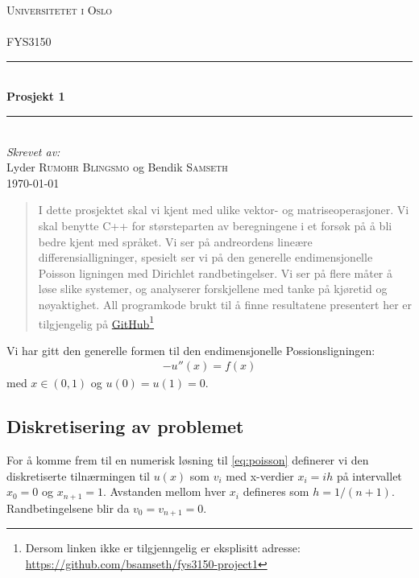 \documentclass[11pt]{article}
\begin{document}
\begin{titlepage}
\newcommand{\HRule}{\rule{\linewidth}{0.5mm}}
\center
\textsc{\LARGE Universitetet i Oslo}\\[1.5cm] %
\textsc{\Large }\\[0.5cm] %
\textsc{\large FYS3150}\\[0.5cm] %
\HRule \\[0.4cm]
{ \huge \bfseries Prosjekt 1 }\\[0.4cm] %
\HRule \\[1.5cm]
\Large \emph{Skrevet av:}\\
Lyder \textsc{Rumohr Blingsmo} og Bendik \textsc{Samseth}\\[3cm]
{\large \today}\\[3cm]
\vfill
\end{titlepage}


\begin{abstract}
I dette prosjektet skal vi kjent med ulike vektor- og
matriseoperasjoner. Vi skal benytte C++ for størsteparten av
beregningene i et forsøk på å bli bedre kjent med språket. Vi ser på
andreordens lineære differensialligninger, spesielt ser vi på den
generelle endimensjonelle Poisson ligningen med Dirichlet
randbetingelser. Vi ser på flere måter å løse slike systemer, og
analyserer forskjellene med tanke på kjøretid og nøyaktighet. All
programkode brukt til å finne resultatene presentert her er
tilgjengelig på
\href{https://github.com/bsamseth/fys3150-project1}{GitHub}\footnote{\label{GitHub-link}Dersom
  linken ikke er tilgjenngelig er eksplisitt adresse: \url{https://github.com/bsamseth/fys3150-project1}}
\end{abstract}


Vi har gitt den generelle formen til den endimensjonelle
Possionsligningen:
\begin{align}
  -u''(x) = f(x)\label{eq:poisson}
\end{align}
med $x \in (0,1)$ og $u(0) = u(1) = 0$.

\subsection{Diskretisering av problemet}

For å komme frem til en numerisk løsning til \eqref{eq:poisson}
definerer vi den diskretiserte tilnærmingen til $u(x)$ som $v_i$ med
x-verdier $x_i = ih$ på intervallet $x_0 = 0$ og $x_{n+1} =
1$. Avstanden mellom hver $x_i$ defineres som $h =
1/(n+1)$. Randbetingelsene blir da $v_0 = v_{n+1} = 0$.
\end{document}
